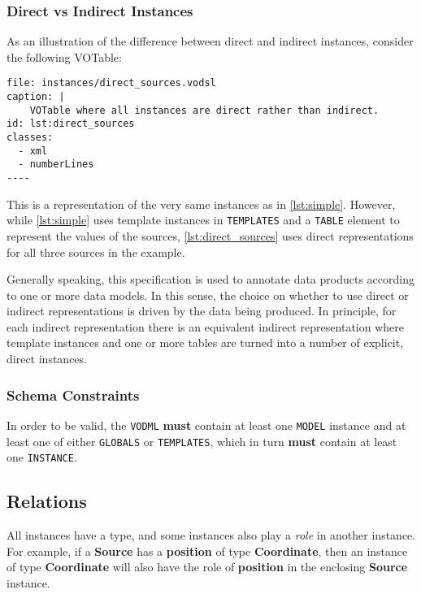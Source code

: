 \documentclass[11pt,a4paper]{ivoa}
\begin{document}
\subsubsection{Direct vs Indirect
Instances}\label{direct-vs-indirect-instances}

As an illustration of the difference between direct and indirect
instances, consider the following VOTable:

\begin{verbatim}
file: instances/direct_sources.vodsl
caption: |
    VOTable where all instances are direct rather than indirect.
id: lst:direct_sources
classes:
  - xml
  - numberLines
----
\end{verbatim}

This is a representation of the very same instances as in
\ref{lst:simple}. However, while \ref{lst:simple} uses template
instances in \texttt{TEMPLATES} and a \texttt{TABLE} element to
represent the values of the sources, \ref{lst:direct_sources} uses
direct representations for all three sources in the example.

Generally speaking, this specification is used to annotate data products
according to one or more data models. In this sense, the choice on
whether to use direct or indirect representations is driven by the data
being produced. In principle, for each indirect representation there is
an equivalent indirect representation where template instances and one
or more tables are turned into a number of explicit, direct instances.

\subsubsection{Schema Constraints}\label{schema-constraints}

In order to be valid, the \texttt{VODML} \textbf{must} contain at least
one \texttt{MODEL} instance and at least one of either \texttt{GLOBALS}
or \texttt{TEMPLATES}, which in turn \textbf{must} contain at least one
\texttt{INSTANCE}.

\subsection{Relations}\label{sec:norm-relations}

All instances have a type, and some instances also play a \emph{role} in
another instance. For example, if a \textbf{Source} has a
\textbf{position} of type \textbf{Coordinate}, then an instance of type
\textbf{Coordinate} will also have the role of \textbf{position} in the
enclosing \textbf{Source} instance.
\end{document}
